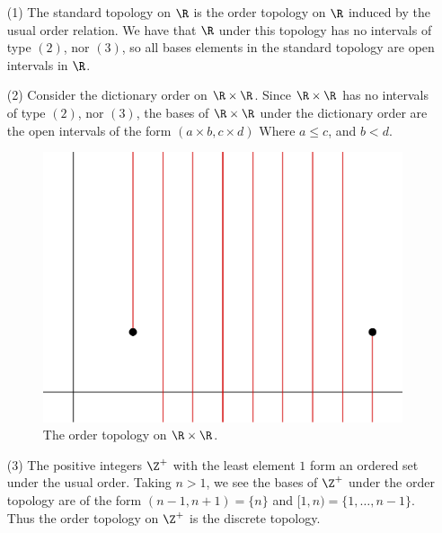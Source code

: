 \begin{example}
    \begin{enumerate}
        \item[(1)] The standard topology on $\R$ is the order topology on $\R$ induced by the
            usual order relation. We have that $\R$ under this topology has no intervals of
            type  $(2)$, nor  $(3)$, so all bases elements in the standard topology are
            open intervals in $\R$.

        \item[(2)] Consider the dictionary order on  $\R \times \R$. Since  $\R \times \R$ has
            no intervals of type $(2)$, nor $(3)$, the bases of  $\R \times \R$ under the
            dictionary order are the open intervals of the form  $(a \times b, c \times d)$ Where
             $a \leq c$, and  $b<d$.

             \begin{figure}[h]
                 \centering
                 \includegraphics[scale = 0.5]{Figures/chapter1/order_topology.eps}
                 \caption{The order topology on $\R \times \R$.}
                 \label{fig1.3}
             \end{figure}

         \item[(3)] The positive integers  $\Z^+$ with the least element  $1$ form an ordered set
             under the usual order. Taking  $n>1$, we see the bases of  $\Z^+$ under the order
             topology are of the form  $(n-1,n+1)=\{n\}$ and $[1,n)=\{1, \dots ,n-1\}$. Thus
             the order topology on  $\Z^+$ is the discrete topology.



\end{enumerate}
\end{example}
